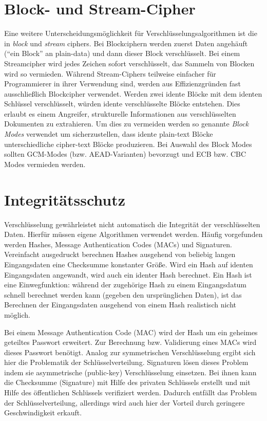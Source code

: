 \section{Block- und Stream-Cipher}

Eine weitere Unterscheidungsmöglichkeit für Verschlüsselungsalgorithmen ist die in \textit{block} und \textit{stream} ciphers. Bei Blockciphern werden zuerst Daten angehäuft (``ein Block'' an plain-data) und dann dieser Block verschlüsselt. Bei einem Streamcipher wird jedes Zeichen sofort verschlüsselt, das Sammeln von Blocken wird so vermieden. Während Stream-Ciphers teilweise einfacher für Programmierer in ihrer Verwendung sind, werden aus Effizienzgründen fast ausschließlich Blockcipher verwendet. Werden zwei idente Blöcke mit dem identen Schlüssel verschlüsselt, würden idente verschlüsselte Blöcke entstehen. Dies erlaubt es einem Angreifer, strukturelle Informationen aus verschlüsselten Dokumenten zu extrahieren. Um dies zu vermeiden werden so genannte \textit{Block Modes} verwendet um sicherzustellen, dass idente plain-text Blöcke unterschiedliche cipher-text Blöcke produzieren. Bei Auswahl des Block Modes sollten GCM-Modes (bzw. AEAD-Varianten) bevorzugt und ECB bzw. CBC Modes vermieden werden.

\section{Integritätsschutz}

Verschlüsselung gewährleistet nicht automatisch die Integrität der verschlüsselten Daten. Hierfür müssen eigene Algorithmen verwendet werden. Häufig vorgefunden werden Hashes, Message Authentication Codes (MACs) und Signaturen. Vereinfacht ausgedruckt berechnen Hashes ausgehend von beliebig langen Eingangsdaten eine Checksumme konstanter Größe. Wird ein Hash auf identen Eingangsdaten angewandt, wird auch ein identer Hash berechnet. Ein Hash ist eine Einwegfunktion: während der zugehörige Hash zu einem Eingangsdatum schnell berechnet werden kann (gegeben den ursprünglichen Daten), ist das Berechnen der Eingangsdaten ausgehend von einem Hash realistisch nicht möglich.

Bei einem Message Authentication Code (MAC) wird der Hash um ein geheimes geteiltes Passwort erweitert. Zur Berechnung bzw. Validierung eines MACs wird dieses Passwort benötigt. Analog zur symmetrischen Verschlüsselung ergibt sich hier die Problematik der Schlüsselverteilung. Signaturen lösen dieses Problem indem sie asymmetrische (public-key) Verschlüsselung einsetzen. Bei ihnen kann die Checksumme (Signature) mit Hilfe des privaten Schlüssels erstellt und mit Hilfe des öffentlichen Schlüssels verifiziert werden. Dadurch entfällt das Problem der Schlüsselverteilung, allerdings wird auch hier der Vorteil durch geringere Geschwindigkeit erkauft.

